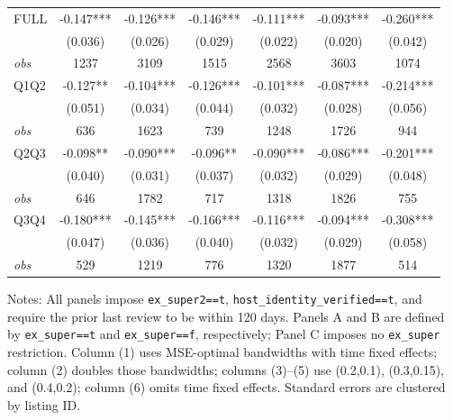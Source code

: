 \begin{table}[!htbp]
\begin{tabular}{lcccccc}
FULL & -0.147*** & -0.126*** & -0.146*** & -0.111*** & -0.093*** & -0.260*** \\
 & (0.036) & (0.026) & (0.029) & (0.022) & (0.020) & (0.042) \\
\textit{obs} & 1237 & 3109 & 1515 & 2568 & 3603 & 1074 \\
Q1Q2 & -0.127** & -0.104*** & -0.126*** & -0.101*** & -0.087*** & -0.214*** \\
 & (0.051) & (0.034) & (0.044) & (0.032) & (0.028) & (0.056) \\
\textit{obs} & 636 & 1623 & 739 & 1248 & 1726 & 944 \\
Q2Q3 & -0.098** & -0.090*** & -0.096** & -0.090*** & -0.086*** & -0.201*** \\
 & (0.040) & (0.031) & (0.037) & (0.032) & (0.029) & (0.048) \\
\textit{obs} & 646 & 1782 & 717 & 1318 & 1826 & 755 \\
Q3Q4 & -0.180*** & -0.145*** & -0.166*** & -0.116*** & -0.094*** & -0.308*** \\
 & (0.047) & (0.036) & (0.040) & (0.032) & (0.029) & (0.058) \\
\textit{obs} & 529 & 1219 & 776 & 1320 & 1877 & 514 \\
\bottomrule
\end{tabular}
\begin{minipage}{0.98\textwidth}\footnotesize
Notes: All panels impose \texttt{ex\_super2==t}, \texttt{host\_identity\_verified==t}, and require the prior last review to be within 120 days. Panels A and B are defined by \texttt{ex\_super==t} and \texttt{ex\_super==f}, respectively; Panel C imposes no \texttt{ex\_super} restriction. Column (1) uses MSE-optimal bandwidths with time fixed effects; column (2) doubles those bandwidths; columns (3)--(5) use (0.2,0.1), (0.3,0.15), and (0.4,0.2); column (6) omits time fixed effects. Standard errors are clustered by listing ID.
\end{minipage}
\end{table}

